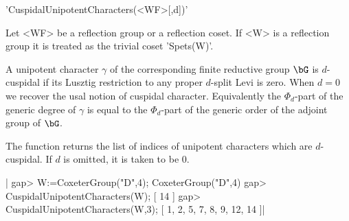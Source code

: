 'CuspidalUnipotentCharacters(<WF>[,d])'

Let  <WF>  be  a  reflection  group  or  a  reflection  coset.  If <W> is a
reflection  group it is  treated as the  trivial coset 'Spets(W)'.

A  unipotent character $\gamma$ of the corresponding finite reductive group
$\bG$  is $d$-cuspidal if  its Lusztig restriction  to any proper $d$-split
Levi  is zero. When $d=0$ we recover the usal notion of cuspidal character.
Equivalently  the $\Phi_d$-part of the generic  degree of $\gamma$ is equal
to the $\Phi_d$-part of the generic order of the adjoint group of $\bG$.

The function returns the list of indices of unipotent characters which are
$d$-cuspidal. If $d$ is omitted, it is taken to be $0$.

|    gap> W:=CoxeterGroup("D",4);
    CoxeterGroup("D",4)
    gap> CuspidalUnipotentCharacters(W);
    [ 14 ]
    gap> CuspidalUnipotentCharacters(W,3);
    [ 1, 2, 5, 7, 8, 9, 12, 14 ]|

